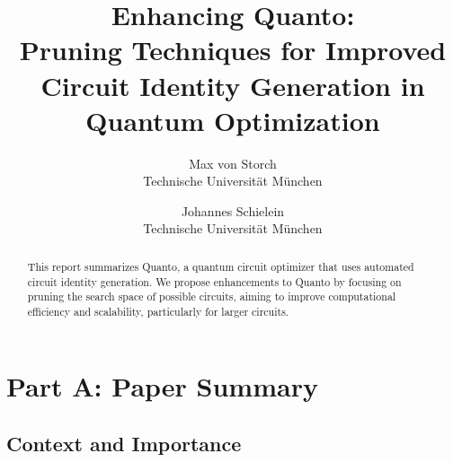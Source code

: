 \renewcommand\theadfont{\bfseries}

\usepackage{filecontents}





\title{\Large \bf Enhancing Quanto:\\Pruning Techniques for Improved Circuit Identity Generation in Quantum Optimization}

\author{
{\rm Max von Storch}\\
Technische Universität München
\and
{\rm Johannes Schielein}\\
Technische Universität München
} %

\maketitle

\begin{abstract}
This report summarizes Quanto, a quantum circuit optimizer that uses automated circuit identity generation. We propose enhancements to Quanto by focusing on pruning the search space of possible circuits, aiming to improve computational efficiency and scalability, particularly for larger circuits.  
\end{abstract}


\section{Part A: Paper Summary}

\subsection{Context and Importance}

